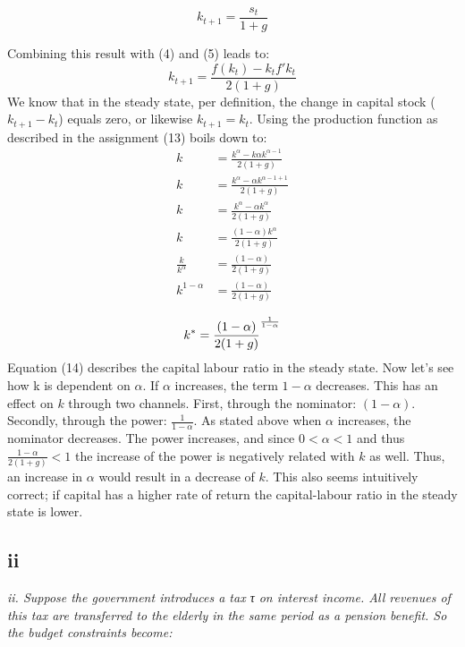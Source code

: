\documentclass[11pt,a4paper]{article}
\begin{document}
\begin{equation}
k_{t+1}=\frac{s_t}{1+g}
\end{equation}

Combining this result with (4) and (5) leads to:
\begin{equation}
k_{t+1}=\frac{f(k_t)-k_tf'k_t}{2(1+g)}
\end{equation}
We know that in the steady state, per definition, the change in capital stock (${k_{t+1}}-{k_t}$) equals zero, or likewise $k_{t+1}=k_t$. Using the production function as described in the assignment (13) boils down to:
\begin{align*}
k&=\frac{k^\alpha-k\alpha k^{\alpha-1}}{2(1+g)} \\
k&=\frac{k^\alpha-\alpha k^{\alpha-1+1}}{2(1+g)} \\
k&=\frac{k^\alpha-\alpha k^{\alpha}}{2(1+g)} \\
k&=\frac{(1-\alpha) k^\alpha}{2(1+g)} \\
\frac{k}{k^\alpha}&=\frac{(1-\alpha)}{2(1+g)}\\
k^{1-\alpha}&=\frac{(1-\alpha)}{2(1+g)}\\
\end{align*}
\begin{equation}
k^*=\frac{(1-\alpha)}{2(1+g)}^{\frac{1}{1-\alpha}} \\
\end{equation}
Equation (14) describes the capital labour ratio  in the steady state. Now let's see how k is dependent on $\alpha$. If $\alpha$ increases, the term $1-\alpha$ decreases. This has an effect on $k$ through two channels. First, through the nominator: $(1-\alpha)$. Secondly, through the power: $\frac{1}{1-\alpha}$. As stated above when $\alpha$ increases, the nominator decreases. The power increases, and since $0<\alpha<1$ and thus $\frac{1-\alpha}{2(1+g)}<1$ the increase of the power is negatively related with $k$ as well. Thus, an increase in $\alpha$ would result in a decrease of $k$. This also seems intuitively correct; if capital has a higher rate of return the capital-labour ratio in the steady state is lower.

    \subsection{ii}
\textit{ii. Suppose the government introduces a tax τ on interest income. All revenues
of this tax are transferred to the elderly in the same period as a pension benefit.
So the budget constraints become:}
\end{document}
